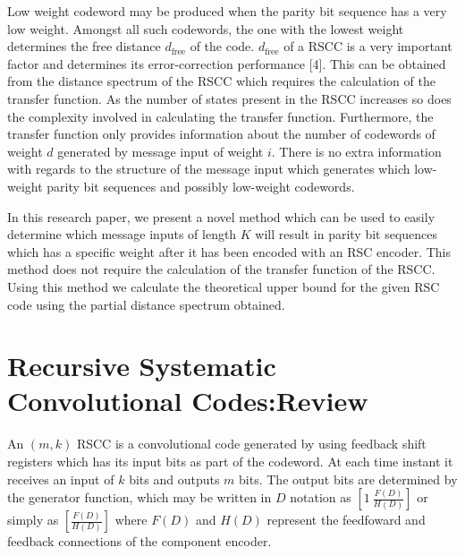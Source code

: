 \documentclass[fontsize=12pt]{article}
\begin{document}
Low weight codeword may be produced when the parity bit sequence has a very low weight. Amongst all such codewords, the one with the lowest weight determines the free distance $d_{\text{free}}$ of the code. 
$d_{\text{free}}$  of a RSCC is a very important factor and determines its error-correction performance [4].  This can be obtained from the distance spectrum of the RSCC which requires the calculation of the transfer function. %
 As the number of states present in the RSCC increases so does the complexity involved in calculating the transfer function. Furthermore, the transfer function only provides information about the number of codewords of weight $d$ generated by message input of weight $i$. There is no extra information with regards to the structure of the message input which generates which low-weight parity bit sequences and possibly low-weight codewords.

In this research paper, we present a novel method which can be used to easily determine which message inputs of length $K$ will result in parity bit sequences which has a specific weight after it has been encoded with an RSC encoder. This method does not require the calculation of the transfer function of the RSCC. Using this method we calculate the theoretical upper bound for the given RSC code using the partial distance spectrum obtained. 

\section{Recursive Systematic Convolutional Codes:Review}
\label{sec2}

An  $(m,k)$ RSCC is a convolutional code generated by using feedback shift registers which has its input bits as part of the codeword. At each time instant it receives an input of $k$ bits and outputs $m$ bits. The output bits are determined by the generator function, which may be written in $D$ notation as  $[1 ~\frac{F(D)}{H(D)}]$ or simply as $[\frac{F(D)}{H(D)}]$ where $F(D)$ and $H(D)$ represent the feedfoward and feedback connections of the component encoder.
\end{document}
